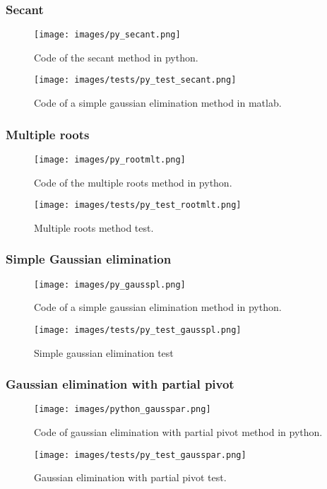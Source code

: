 \documentclass{article}
\begin{document}
\subsubsection{Secant}
\begin{figure}[ht]
\centering
\texttt{[image: images/py\_secant.png]}
\caption{\label{fig:py_secant}Code of the secant method in python.}
\end{figure}
\FloatBarrier
\begin{figure}[ht]
\centering
\texttt{[image: images/tests/py\_test\_secant.png]}
\caption{\label{fig:py_gausstot}Code of a simple gaussian elimination method in matlab.}
\end{figure}
\FloatBarrier

\subsubsection{Multiple roots}
\begin{figure}[ht]
\centering
\texttt{[image: images/py\_rootmlt.png]}
\caption{\label{fig:py_rootmlt}Code of the multiple roots method in python.}
\end{figure}
\FloatBarrier
\begin{figure}[ht]
\centering
\texttt{[image: images/tests/py\_test\_rootmlt.png]}
\caption{\label{fig:py_rootmlt}Multiple roots method test.}
\end{figure}
\FloatBarrier

\subsubsection{Simple Gaussian elimination}
\begin{figure}[ht]
\centering
\texttt{[image: images/py\_gausspl.png]}
\caption{\label{fig:py_gausspl}Code of a simple gaussian elimination method in python.}
\end{figure}
\FloatBarrier
\begin{figure}[ht]
\centering
\texttt{[image: images/tests/py\_test\_gausspl.png]}
\caption{\label{fig:py_gausspl}Simple gaussian elimination test}
\end{figure}
\FloatBarrier

\subsubsection{Gaussian elimination with partial pivot}
\begin{figure}[ht]
\centering
\texttt{[image: images/python\_gausspar.png]}
\caption{\label{fig:py_gausspar}Code of gaussian elimination with partial pivot method in python.}
\end{figure}
\FloatBarrier
\begin{figure}[ht]
\centering
\texttt{[image: images/tests/py\_test\_gausspar.png]}
\caption{\label{fig:py_gausspar}Gaussian elimination with partial pivot test.}
\end{figure}
\FloatBarrier
\end{document}
